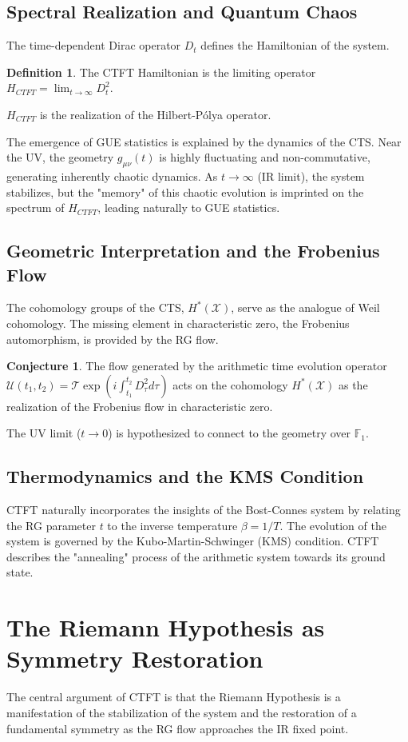 \documentclass[11pt, a4paper]{article}
\theoremstyle{definition}
\newtheorem{definition}{Definition}[section]
\newtheorem{conjecture}{Conjecture}[section]
\newcommand{\CTS}{\mathcal{X}}
\newcommand{\F}{\mathbb{F}_1}
\begin{document}
\subsection{Spectral Realization and Quantum Chaos}
The time-dependent Dirac operator $D_t$ defines the Hamiltonian of the system.
\begin{definition}
The CTFT Hamiltonian is the limiting operator $H_{CTFT} = \lim_{t\to\infty} D_t^2$.
\end{definition}
$H_{CTFT}$ is the realization of the Hilbert-Pólya operator.

The emergence of GUE statistics is explained by the dynamics of the CTS. Near the UV, the geometry $g_{\mu\nu}(t)$ is highly fluctuating and non-commutative, generating inherently chaotic dynamics. As $t\to\infty$ (IR limit), the system stabilizes, but the "memory" of this chaotic evolution is imprinted on the spectrum of $H_{CTFT}$, leading naturally to GUE statistics.

\subsection{Geometric Interpretation and the Frobenius Flow}
The cohomology groups of the CTS, $H^*(\CTS)$, serve as the analogue of Weil cohomology. The missing element in characteristic zero, the Frobenius automorphism, is provided by the RG flow.

\begin{conjecture}
The flow generated by the arithmetic time evolution operator $\mathcal{U}(t_1, t_2) = \mathcal{T} \exp\left(i \int_{t_1}^{t_2} D_\tau^2 d\tau\right)$ acts on the cohomology $H^*(\CTS)$ as the realization of the Frobenius flow in characteristic zero.
\end{conjecture}

The UV limit ($t\to 0$) is hypothesized to connect to the geometry over $\F$.

\subsection{Thermodynamics and the KMS Condition}
CTFT naturally incorporates the insights of the Bost-Connes system by relating the RG parameter $t$ to the inverse temperature $\beta = 1/T$. The evolution of the system is governed by the Kubo-Martin-Schwinger (KMS) condition. CTFT describes the "annealing" process of the arithmetic system towards its ground state.

\section{The Riemann Hypothesis as Symmetry Restoration}
The central argument of CTFT is that the Riemann Hypothesis is a manifestation of the stabilization of the system and the restoration of a fundamental symmetry as the RG flow approaches the IR fixed point.
\end{document}
